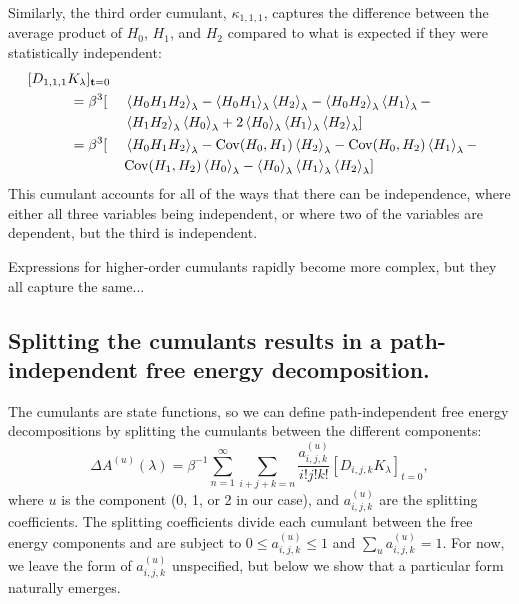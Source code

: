 \documentclass{article}
\let\vec\mathbf
\begin{document}
Similarly, the third order cumulant, $\kappa_{1,1,1}$, captures the difference between the average product of $H_0$, $H_1$, and $H_2$ compared to what is expected if they were statistically independent:
\begin{alignat}{3}
\MoveEqLeft[3] [D_{1, 1, 1} K_\lambda]_{\vec t=0}\notag\\
&= \beta^3[ &&
\left\langle H_0 H_1 H_2 \right\rangle_\lambda -
\left\langle H_0 H_1 \right\rangle_\lambda
	\left\langle H_2 \right\rangle_\lambda -
\left\langle H_0 H_2 \right\rangle_\lambda
	\left\langle H_1 \right\rangle_\lambda - \notag\\
&&& \left\langle H_1 H_2 \right\rangle_\lambda
	\left\langle H_0 \right\rangle_\lambda +
2 \left\langle H_0 \right\rangle_\lambda
	\left\langle H_1 \right\rangle_\lambda
	\left\langle H_2 \right\rangle_\lambda]\notag\\
&= \beta^3[ &&
	\left\langle H_0 H_1 H_2 \right\rangle_\lambda -
	\mathrm{Cov}(H_0,H_1) \left\langle H_2 \right\rangle_\lambda -
	\mathrm{Cov}(H_0,H_2) \left\langle H_1 \right\rangle_\lambda -\\
	&&& \mathrm{Cov}(H_1,H_2) \left\langle H_0 \right\rangle_\lambda -
	\left\langle H_0 \right\rangle_\lambda
		\left\langle H_1 \right\rangle_\lambda
		\left\langle H_2 \right\rangle_\lambda]        
\end{alignat}
This cumulant accounts for all of the ways that there can be independence, where either all three variables being independent, or where two of the variables are dependent, but the third is independent.

Expressions for higher-order cumulants rapidly become more complex, but they all capture the same...

\subsection{Splitting the cumulants results in a path-independent free energy decomposition.}

The cumulants are state functions, so we can define path-independent free energy decompositions by splitting the cumulants between the different components:
\begin{equation}
\Delta A^{(u)}(\lambda) =
	\beta^{-1} \sum_{n=1}^{\infty}
	\sum_{i+j+k=n}
	\frac{a_{i,j,k}^{(u)}}{i!j!k!}\left[ D_{i,j,k} K_\lambda\right]_{t=0},
\end{equation}
where $u$ is the component (0, 1, or 2 in our case), and $a_{i,j,k}^{(u)}$ are the splitting coefficients. The splitting coefficients divide each cumulant between the free energy components and are subject to $0 \le a_{i,j,k}^{(u)} \le 1$ and $\sum_u a_{i,j,k}^{(u)}=1$. For now, we leave the form of $a_{i,j,k}^{(u)}$ unspecified, but below we show that a particular form naturally emerges.
\end{document}
